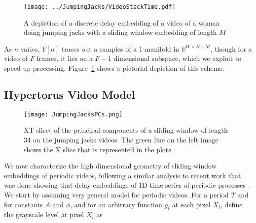 \documentclass[a4paper,UKenglish]{lipics}
\begin{document}
\begin{figure}[]
	\centering
	\texttt{[image: ../JumpingJacks/VideoStackTime.pdf]}
	\caption{A depiction of a discrete delay embedding of a video of a woman doing jumping jacks with a sliding window embedding of length $M$}
	\label{fig:VideoDiscreteDelayEmbedding}
\end{figure}

As $n$ varies, $Y[n]$ traces out a samples of a 1-manifold in $\mathbb{R}^{W \times H \times M}$, though for a video of $F$ frames, it lies on a $F-1$ dimensional subspace, which we exploit to speed up processing. Figure~\ref{fig:VideoDiscreteDelayEmbedding} shows a pictorial depiction of this scheme.

\subsection{Hypertorus Video Model}
\label{sec:VideoModel}

\begin{figure}[]
	\centering
	\texttt{[image: JumpingJacksPCs.png]}
	\caption{XT slices of the principal components of a sliding window of length 34 on the jumping jacks videos.  The green line on the left image shows the X slice that is represented in the plots}
	\label{fig:JumpingJacksPCs}
\end{figure}


We now characterize the high dimensional geometry of sliding window embeddings of periodic videos, following a similar analysis to recent work that was done showing that delay embeddings of 1D time series of periodic processes \cite{perea2013sliding}.  We start by assuming very general model for periodic videos.  For a period $T$ and for constants $A$ and $\phi$, and for an arbitrary function $g_i$ at each pixel $X_i$, define the grayscale level at pixel $X_i$ as 
\end{document}
